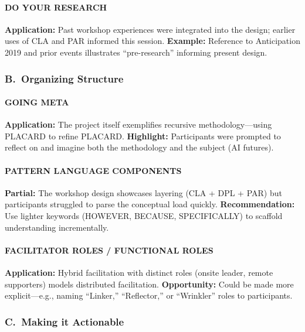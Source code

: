 \documentclass[acmlarge,timestamp]{acmart}
\begin{document}
{\paragraph*{DO YOUR RESEARCH}

\noindent \textbf{Application:} Past workshop experiences were integrated into the design; earlier uses of CLA and PAR informed this session.  \textbf{Example:} Reference to Anticipation 2019 and prior events illustrates “pre-research” informing present design.

\subsubsection*{B.~Organizing Structure}

\paragraph*{GOING META}

\noindent \textbf{Application:} The project itself exemplifies recursive methodology—using PLACARD to refine PLACARD. \textbf{Highlight:} Participants were prompted to reflect on and imagine both the methodology and the subject (AI futures).

\paragraph*{PATTERN LANGUAGE COMPONENTS}

\noindent \textbf{Partial:} The workshop design showcases layering (CLA + DPL + PAR) but participants struggled to parse the conceptual load quickly. \textbf{Recommendation:} Use lighter keywords (HOWEVER, BECAUSE, SPECIFICALLY) to scaffold understanding incrementally.

\paragraph*{FACILITATOR ROLES / FUNCTIONAL ROLES}

\noindent \textbf{Application:} Hybrid facilitation with distinct roles (onsite leader, remote supporters) models distributed facilitation. \textbf{Opportunity:} Could be made more explicit—e.g., naming “Linker,” “Reflector,” or “Wrinkler” roles to participants.

\subsubsection*{C.~Making it Actionable}

}
\end{document}
